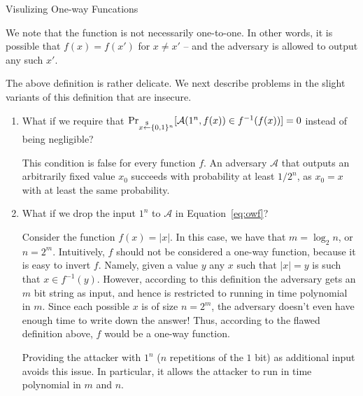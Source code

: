 \documentclass[12pt]{tufte-book}
\begin{document}
\begin{marginfigure}[-10cm]
\caption{Visulizing One-way Funcations}
\label{fig:owf}
\end{marginfigure}



We note that the function is not necessarily one-to-one. In other words, it is possible that $f(x) = f(x')$ for $x \neq x'$ -- and the adversary is allowed to output any such $x'$.

The above definition is rather delicate. We next describe problems in the slight variants of this definition that are insecure.

\begin{enumerate}
\item What if we require that
    $\Pr_{x \stackrel{\$}{\leftarrow} \{0,1\}^{n}}[ \mathcal{A}(1^n, f(x)) \in f^{-1}(f(x))] = 0$ instead of being negligible?

This condition is false for every function $f$. An adversary $\mathcal{A}$ that outputs an arbitrarily fixed value $x_0$ succeeds with probability at least $1/2^{n}$, as $x_0 = x$ with at least the same probability.

\item  What if we drop the input $1^n$ to $\mathcal{A}$ in Equation~\ref{eq:owf}?

Consider the function $f(x) = |x|$.  In this case, we have that $m = \log_2 n$, or $n = 2^m$.  Intuitively, $f$ should not be considered a one-way function, because it is easy to invert $f$. Namely, given a value $y$ any $x$ such that $|x| = y$ is such that $x \in f^{-1}(y)$.  However, according to this definition the adversary gets an $m$ bit string as input, and hence is restricted to running in time polynomial in $m$. Since each possible $x$ is of size $n = 2^m$, the adversary doesn't even have enough time to write down the answer!  Thus, according to the flawed definition above, $f$ would be a one-way function.

Providing the attacker with $1^n$ ($n$ repetitions of the $1$ bit) as additional input avoids this issue.  In particular, it allows the attacker to run in time polynomial in $m$ and $n$.
\end{enumerate}
\end{document}
